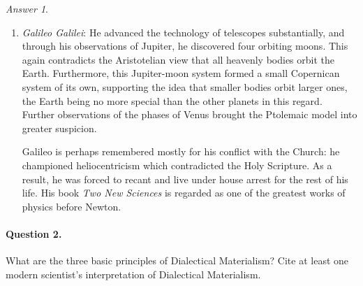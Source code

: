 \documentclass[11pt]{article}
\theoremstyle{remark}
\newtheorem*{answer}{Answer}
\begin{document}
\begin{answer}
\begin{enumerate}
            \item \emph{Galileo Galilei}: He advanced the technology of telescopes
            substantially, and through his observations of Jupiter, he discovered
            four orbiting moons. This again contradicts the Aristotelian view that
            all heavenly bodies orbit the Earth. Furthermore, this Jupiter-moon
            system formed a small Copernican system of its own, supporting the idea
            that smaller bodies orbit larger ones, the Earth being no more special
            than the other planets in this regard. Further observations of the phases
            of Venus brought the Ptolemaic model into greater suspicion.

            Galileo is perhaps remembered mostly for his conflict with the Church: he
            championed heliocentricism which contradicted the Holy Scripture. As a
            result, he was forced to recant and live under house arrest for the rest
            of his life. His book \emph{Two New Sciences} is regarded as one of the
            greatest works of physics before Newton.
        \end{enumerate}
    \end{answer}

    \paragraph{Question 2.} What are the three basic principles of Dialectical
    Materialism? Cite at least one modern scientist's interpretation of Dialectical
    Materialism.
\end{document}
